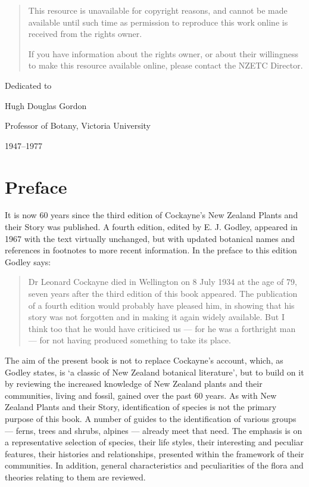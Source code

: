 \markboth{}{}
\begin{quote}
    This resource is unavailable for copyright reasons, and cannot be made available until such time as permission to reproduce this work online is received from the rights owner.

    If you have information about the rights owner, or about their willingness to make this resource available online, please contact the NZETC Director.
\end{quote}

Dedicated to\par
Hugh Douglas Gordon\par
Professor of Botany, Victoria University\par
1947–1977

\chapter*{Preface}

It is now 60 years since the third edition of Cockayne's New Zealand Plants and their Story was published.
A fourth edition, edited by E. J. Godley, appeared in 1967 with the text virtually unchanged, but with updated botanical names and references in footnotes to more recent information.
In the preface to this edition Godley says:

\begin{quote}
    Dr Leonard Cockayne died in Wellington on 8 July 1934 at the age of 79, seven years after the third edition of this book appeared.
    The publication of a fourth edition would probably have pleased him, in showing that his story was not forgotten and in making it again widely available.
    But I think too that he would have criticised us --- for he was a forthright man --- for not having produced something to take its place.
\end{quote}

The aim of the present book is not to replace Cockayne's account, which, as Godley states, is `a classic of New Zealand botanical literature', but to build on it by reviewing the increased knowledge of New Zealand plants and their communities, living and fossil, gained over the past 60 years.
As with New Zealand Plants and their Story, identification of species is not the primary purpose of this book.
A number of guides to the identification of various groups --- ferns, trees and shrubs, alpines --- already meet that need.
The emphasis is on a representative selection of species, their life styles, their interesting and peculiar features, their histories and relationships, presented within the framework of their communities.
In addition, general characteristics and peculiarities of the flora and theories relating to them are reviewed.

